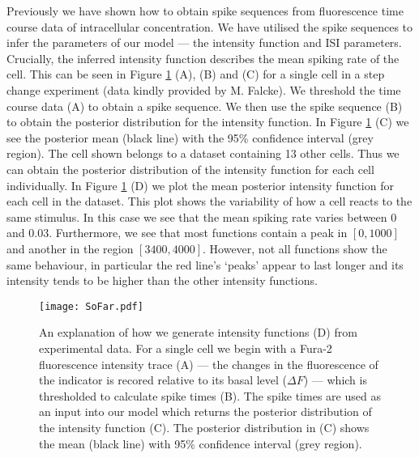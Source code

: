 \documentclass[../main.tex]{subfiles}
\begin{document}
%
Previously we have shown how to obtain  spike sequences from fluorescence time course data of intracellular  concentration. We have utilised the  spike sequences to infer the parameters of our model --- the intensity function and ISI parameters. Crucially, the inferred intensity function describes the mean spiking rate of the cell. This can be seen in Figure \ref{fig:SoFar} (A), (B) and (C) for a single cell in a step change experiment (data kindly provided by M. Falcke). We threshold the time course data (A) to obtain a  spike sequence. We then use the  spike sequence (B) to obtain the posterior distribution for the intensity function. In Figure \ref{fig:SoFar} (C) we see the posterior mean (black line) with the 95\% confidence interval (grey region). The cell shown belongs to a dataset containing 13 other cells. Thus we can obtain the posterior distribution of the intensity function for each cell individually. In Figure \ref{fig:SoFar} (D) we plot the mean posterior intensity function for each cell in the dataset.  This plot shows the variability of how a cell reacts to the same stimulus. In this case we see that the mean spiking rate varies between $0$ and $0.03$. Furthermore, we see that most functions contain a peak in $[0,1000]$ and another in the region $[3400,4000]$. However, not all functions show the same behaviour, in particular the red line's `peaks' appear to last longer and its intensity tends to be higher than the other intensity functions.

     \begin{figure}[t!]
   \hrulefill
   \begin{center} 
    {\texttt{[image: SoFar.pdf]} }
    \end{center}     
    \caption{An explanation of how we generate intensity functions (D) from experimental data. For a single cell we begin with a Fura-2 fluorescence intensity trace (A) --- the changes in the fluorescence of the  indicator is recored relative to its basal level ($\Delta F$) --- which is thresholded to calculate  spike times (B). The  spike times are used as an input into our model which returns the posterior distribution of the intensity function (C). The posterior distribution in (C) shows the mean (black line) with 95\% confidence interval (grey region).}
    \label{fig:SoFar}
    \hrulefill
    \end{figure}
    
\end{document}
